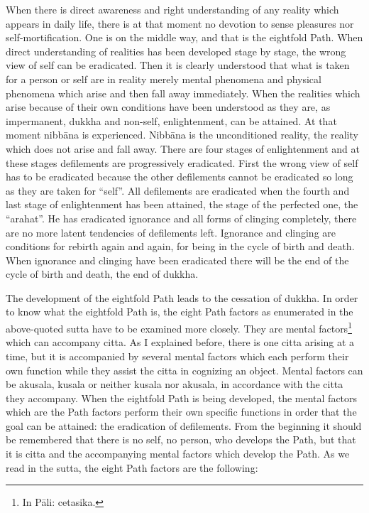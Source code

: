 \documentclass{book}
\begin{document}
When there is direct awareness and right understanding of any reality
which appears in daily life, there is at that moment no devotion to
sense pleasures nor self-mortification. One is on the middle way, and
that is the eightfold Path. When direct understanding of realities has
been developed stage by stage, the wrong view of self can be eradicated.
Then it is clearly understood that what is taken for a person or self
are in reality merely mental phenomena and physical phenomena which
arise and then fall away immediately. When the realities which arise
because of their own conditions have been understood as they are, as
impermanent, dukkha and non-self, enlightenment, can be attained. At
that moment nibbāna is experienced. Nibbāna is the unconditioned
reality, the reality which does not arise and fall away. There are four
stages of enlightenment and at these stages defilements are
progressively eradicated. First the wrong view of self has to be
eradicated because the other defilements cannot be eradi­cated so long
as they are taken for ``self''. All defilements are eradicated when the
fourth and last stage of enlighten­ment has been attained, the stage of
the perfected one, the ``arahat''. He has eradicated ignorance and all
forms of clinging completely, there are no more latent tendencies of
defilements left. Ignorance and clinging are conditions for rebirth
again and again, for being in the cycle of birth and death. When
ignorance and clinging have been eradicated there will be the end of the
cycle of birth and death, the end of dukkha.

The development of the eightfold Path leads to the cessation of dukkha.
In order to know what the eightfold Path is, the eight Path factors as
enumerated in the above-quoted sutta have to be examined more closely.
They are mental factors\footnote{In Pāli: cetasika.} which can accompany
citta. As I explain­ed before, there is one citta arising at a time, but
it is accompanied by several mental factors which each perform their own
function while they assist the citta in cognizing an object. Mental
factors can be akusala, kusala or neither kusala nor akusala, in
accordance with the citta they accompany. When the eightfold Path is
being developed, the mental factors which are the Path factors perform
their own specific functions in order that the goal can be attained: the
eradication of defilements. From the begin­ning it should be remembered
that there is no self, no person, who develops the Path, but that it is
citta and the accompanying mental factors which develop the Path. As we
read in the sutta, the eight Path factors are the following:
\end{document}
